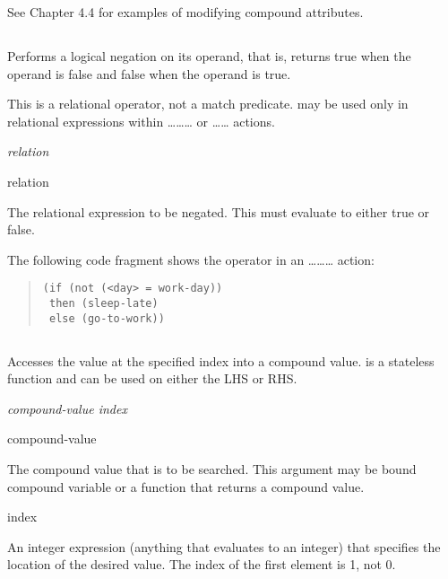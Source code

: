 See Chapter 4.4 for examples of modifying compound attributes.

\subsection{}

Performs a logical negation on its operand, that is, returns true when
the operand is false and false when the operand is true.

\begin{note}
  This is a relational operator, not a match predicate.  may
  be used only in relational expressions within
  \ldots{}\ldots{}\ldots{} or
  \ldots{}\ldots{} actions.
\end{note}

\Format

 \it{relation}

\begin{operands}
\item[relation]

  The relational expression to be negated. This must evaluate to
  either true or false.
\end{operands}

\Example

The following code fragment shows the  operator in an
\ldots{}\ldots{}\ldots{} action:
\begin{quote}
\begin{verbatim}
(if (not (<day> = work-day))
 then (sleep-late)
 else (go-to-work))
\end{verbatim}
\end{quote}

\subsection{}

Accesses the value at the specified index into a compound
value.  is a stateless function and can be used on either the
LHS or RHS.

\Format

 \it{compound-value} \it{index}

\begin{arguments}
\item[compound-value]

  The compound value that is to be searched. This argument may be
  bound compound variable or a function that returns a compound value.

\item[index]

  An integer expression (anything that evaluates to an integer) that
  specifies the location of the desired value. The index of the first
  element is 1, not 0.
\end{arguments}


